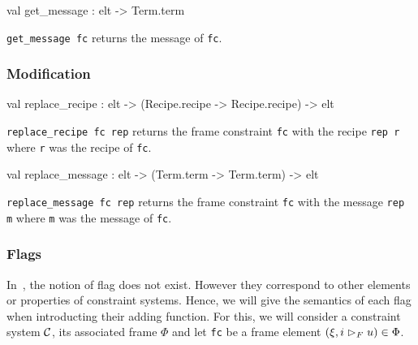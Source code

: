 \begin{ocamldocsigend}
\begin{ocamldocdescription}
\end{ocamldocdescription}


\label{val:Constraint.Frame.get-underscoremessage}\begin{ocamldoccode}
val get_message : elt -> Term.term
\end{ocamldoccode}
\begin{ocamldocdescription}
{\tt{get\_message fc}} returns the message of {\tt{fc}}.


\end{ocamldocdescription}


\subsubsection{Modification}


\label{val:Constraint.Frame.replace-underscorerecipe}\begin{ocamldoccode}
val replace_recipe : elt ->
  (Recipe.recipe -> Recipe.recipe) -> elt
\end{ocamldoccode}
\begin{ocamldocdescription}
{\tt{replace\_recipe fc rep}} returns the frame constraint {\tt{fc}} with the recipe {\tt{rep r}}
      where {\tt{r}} was the recipe of {\tt{fc}}.


\end{ocamldocdescription}


\label{val:Constraint.Frame.replace-underscoremessage}\begin{ocamldoccode}
val replace_message : elt -> (Term.term -> Term.term) -> elt
\end{ocamldoccode}
\begin{ocamldocdescription}
{\tt{replace\_message fc rep}} returns the frame constraint {\tt{fc}} with the message {\tt{rep m}}
      where {\tt{m}} was the message of {\tt{fc}}.


\end{ocamldocdescription}


\subsubsection{Flags}


In~\thesis, the notion of flag does not exist. However they correspond to 
    other elements or properties of constraint systems. Hence, we will give the semantics
    of each flag when introducting their adding function. For this, we will
    consider a constraint system $\mathcal{C}$, its associated frame $\Phi$  and let {\tt{fc}} be 
    a frame element $(\xi, i \vartriangleright_F u) \in \Phi$. 


\end{ocamldocsigend}
